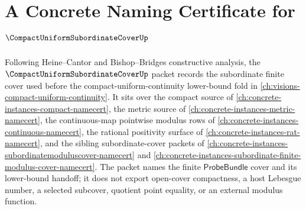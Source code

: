 \chapter{A Concrete Naming Certificate for $\CompactUniformSubordinateCoverUp$}
\label{ch:concrete-instances-compact-uniform-subordinate-cover-namecert}

Following Heine--Cantor and Bishop--Bridges constructive analysis, the $\CompactUniformSubordinateCoverUp$ packet records the subordinate finite cover used before the compact-uniform-continuity lower-bound fold in \autoref{ch:visions-compact-uniform-continuity}. It sits over the compact source of \autoref{ch:concrete-instances-compact-namecert}, the metric source of \autoref{ch:concrete-instances-metric-namecert}, the continuous-map pointwise modulus rows of \autoref{ch:concrete-instances-continuous-namecert}, the rational positivity surface of \autoref{ch:concrete-instances-rat-namecert}, and the sibling subordinate-cover packets of \autoref{ch:concrete-instances-subordinatemoduluscover-namecert} and \autoref{ch:concrete-instances-subordinate-finite-modulus-cover-namecert}. The packet names the finite $\mathsf{ProbeBundle}$ cover and its lower-bound handoff; it does not export open-cover compactness, a host Lebesgue number, a selected subcover, quotient point equality, or an external modulus function.

